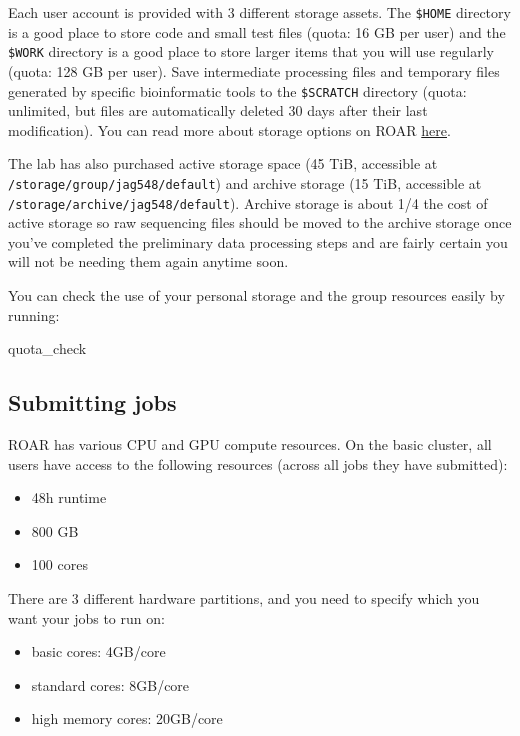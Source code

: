 \documentclass[
]{book}
\newenvironment{Shaded}{\begin{snugshade}}{\end{snugshade}}
\newcommand{\NormalTok}[1]{#1}
\providecommand{\tightlist}{%
  \setlength{\itemsep}{0pt}\setlength{\parskip}{0pt}}
\begin{document}
Each user account is provided with 3 different storage assets. The \texttt{\$HOME} directory is a good place to store code and small test files (quota: 16 GB per user) and the \texttt{\$WORK} directory is a good place to store larger items that you will use regularly (quota: 128 GB per user). Save intermediate processing files and temporary files generated by specific bioinformatic tools to the \texttt{\$SCRATCH} directory (quota: unlimited, but files are automatically deleted 30 days after their last modification). You can read more about storage options on ROAR \href{https://docs.icds.psu.edu/handling-data/file-storage/}{here}.

The lab has also purchased active storage space (45 TiB, accessible at \texttt{/storage/group/jag548/default}) and archive storage (15 TiB, accessible at \texttt{/storage/archive/jag548/default}). Archive storage is about 1/4 the cost of active storage so raw sequencing files should be moved to the archive storage once you've completed the preliminary data processing steps and are fairly certain you will not be needing them again anytime soon.

You can check the use of your personal storage and the group resources easily by running:

\begin{Shaded}
\begin{Highlighting}[]
\NormalTok{quota\_check}
\end{Highlighting}
\end{Shaded}

\subsection{Submitting jobs}\label{submitting-jobs}

ROAR has various CPU and GPU compute resources. On the basic cluster, all users have access to the following resources (across all jobs they have submitted):

\begin{itemize}
\tightlist
\item
  48h runtime
\item
  800 GB
\item
  100 cores
\end{itemize}

There are 3 different hardware partitions, and you need to specify which you want your jobs to run on:

\begin{itemize}
\tightlist
\item
  basic cores: 4GB/core
\item
  standard cores: 8GB/core
\item
  high memory cores: 20GB/core
\end{itemize}
\end{document}

